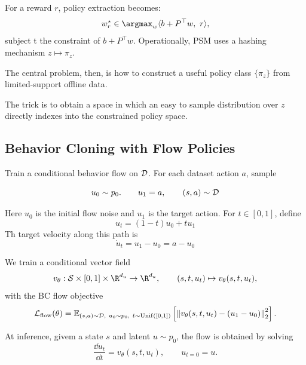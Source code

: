 For a reward $r$, policy extraction becomes: 
\[
    w_r^\star \in \argmax_w \langle b+P^\top w,\ r\rangle,
\]
subject t the constraint of \(b+P^\top w\).
Operationally, PSM uses a hashing mechanism \( z \mapsto \pi_z \).

The central problem, then, is how to construct a useful policy class \(\{\pi_z \}\) from limited-support offline data.

The trick is to obtain a space in which an easy to sample distribution over $z$ directly indexes into the constrained policy space.

\subsection{Behavior Cloning with Flow Policies}

Train a conditional behavior flow on \(\mathcal{D}\). 
For each dataset action $a$, sample

\[
    u_0  \sim p_0. \qquad u_1 = a, \qquad (s,a) \sim \mathcal{D}
\]

Here $u_0$ is the initial flow noise and $u_1$ is the target action.
For $t \in [0,1]$, define
\[
    u_t = (1-t)u_0 + tu_1
\]
Th target velocity along this path is
\[
    \dot u_t = u_1 - u_0 = a - u_0 
\]

We train a conditional vector field 
\[
    v_\theta:\Sspace \times [0,1] \times \R^{d_u} \to \R^{d_u}, \qquad (s,t,u_t)\mapsto v_\theta(s,t,u_t),
\]
with the BC flow objective
\[
    \mathcal L_{\mathrm{flow}} (\theta) = \mathbb{E}_{(s,a) \sim \mathcal{D},\ u_0\sim p_0,\ t\sim \mathrm{Unif}([0,1])}
    \left[ \left\| v_\theta(s,t,u_t) - (u_1-u_0) \right\|_2^2 \right].
\]

At inference, givem a state $s$ and latent $u \sim p_0$, the flow is obtained by solving
\[
    \frac{\dd u_t}{\dd t} = v_\theta(s,t,u_t), \qquad u_{t=0}=u .
\]